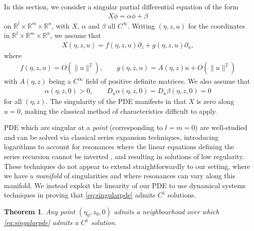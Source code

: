 \documentclass{article}
\newcommand{\RB}{\mathbb{R}}
\theoremstyle{plain}
\newtheorem{theorem}{Theorem}[section]
\theoremstyle{definition}
\theoremstyle{remark}
\begin{document}
In this section, we consider a singular partial differential equation of the form
\begin{align}\label{eq:singularpde}
X\phi = \alpha \phi +\beta
\end{align}
on $\RB^l\times\RB^m\times\RB^n$, with $X$, $\alpha$ and $\beta$ all $C^{\infty}$. Writing $(\eta,z,u)$ for the coordinates in $\RB^l\times\RB^m\times\RB^n$, we assume that
\begin{align}
X(\eta,z,u) = f(\eta,z,u)\partial_z + g(\eta,z,u)\partial_u,
\end{align}
where
\begin{align}
f(\eta,z,u) = O(\|u\|^2),\qquad g(\eta,z,u) = A(\eta,z)u + O(\|u\|^2)
\end{align}
with $A(\eta,z)$ being a $C^{\infty}$ field of positive definite matrices. We also assume that
\begin{align}
\alpha(\eta,z,0)>0,\qquad D_u\alpha(\eta,z,0)=D_u\beta(\eta,z,0) = 0
\end{align}
for all $(\eta,z)$. The singularity of the PDE manifests in that $X$ is zero along $u=0$, making the classical method of characteristics difficult to apply.

PDE which are singular at a \emph{point} (corresponding to $l=m=0$) are well-studied and can be solved via classical series expansion techniques, introducing logarithms to account for resonances where the linear equations defining the series recursion cannot be inverted \cite{frobeniusmethod, tahara1, tahara2, singularpde}, and resulting in solutions of low regularity. These techniques do not appear to extend straightforwardly to our setting, where we have a \emph{manifold} of singularities and where resonances can vary along this manifold. We instead exploit the linearity of our PDE to use dynamical systems techniques in proving that \eqref{eq:singularpde} admits $C^1$ solutions.

\begin{theorem}\label{thm:pdesolve}
Any point $(\eta_0,z_0,0)$ admits a neighbourhood over which \eqref{eq:singularpde} admits a $C^1$ solution.
\end{theorem}
\end{document}
